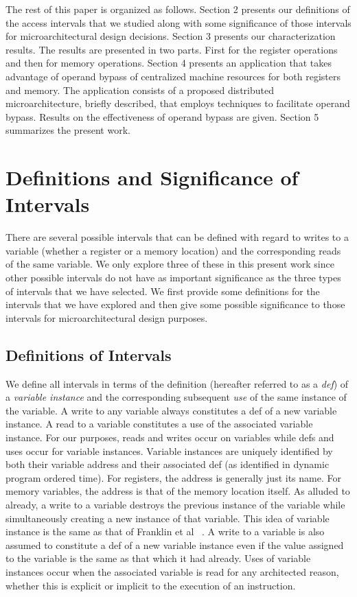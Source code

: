 \documentclass[10pt,dvips]{article}
\begin{document}
The rest of this paper is organized as follows.
Section 2 presents our definitions of the access intervals that
we studied along with some significance of those intervals
for microarchitectural design
decisions.
Section 3 presents our characterization results.
The results are presented in two parts.  
First for the register
operations and then for memory operations.
Section 4 presents an application that takes advantage
of operand bypass of centralized machine resources for both registers 
and memory.
The application consists of a proposed distributed microarchitecture,
briefly described,
that employs techniques to facilitate operand bypass.
Results on the effectiveness of operand bypass are given.
Section 5 summarizes the present work.
%
\section{Definitions and Significance of Intervals}
%
There are several possible intervals that can be defined with
regard to writes to a variable (whether a register or a memory
location) and the corresponding reads of the same variable.
We only explore three of these in this present work since
other possible intervals do not have as important significance
as the three types of intervals that we have selected.
We first provide some definitions for the intervals that
we have explored and then give some possible significance
to those intervals for microarchitectural design purposes.
%
\subsection{Definitions of Intervals}
%
We define all intervals in terms of the definition
(hereafter referred to as a \textit{def}) of a
\textit{variable instance} 
and the corresponding subsequent \textit{use} of the
same instance of the variable.
A write to any variable always constitutes a def of a new
variable instance.
A read to a variable constitutes a use of the associated
variable instance.
For our purposes, reads and writes occur on variables while
defs and uses occur for variable instances.
Variable instances are uniquely identified by both their variable 
address and their associated def (as identified in dynamic program
ordered time).
For registers, the address is generally just its name.  
For memory variables, the address is that of the memory
location itself.  
As alluded to already, a write to a variable 
destroys the previous instance of the variable while simultaneously
creating a new instance of that variable.  
This idea of variable instance is the same as that of 
Franklin et al ~\cite{Franklin92}.
A write to a variable is also assumed to constitute a def of a new
variable instance even if the
value assigned to the variable is the same as that which it
had already.
Uses of variable instances occur when the associated variable
is read for any architected reason, whether this is explicit
or implicit to the execution of an instruction.
\end{document}
